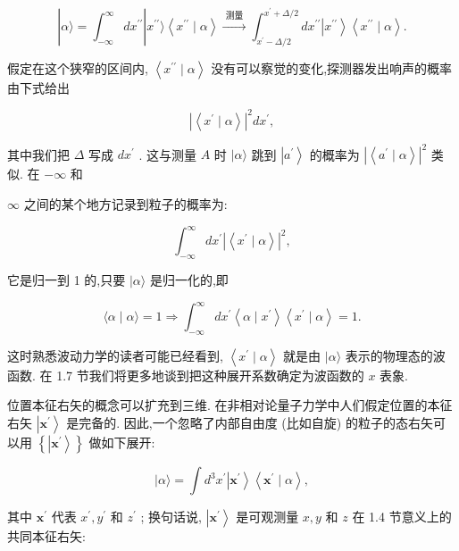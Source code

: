 \documentclass[lang=cn,newtx,10pt,scheme=chinese,thmcnt=section]{elegantbook}
\begin{document}
$$
\left| {\alpha \rangle = {\int }_{-\infty }^{\infty }d{x}^{\prime \prime }}\right| {x}^{\prime \prime }\rangle \left\langle {{x}^{\prime \prime } \mid \alpha }\right\rangle \overset{\text{ 测量 }}{ \rightarrow }{\int }_{{x}^{\prime } - \Delta /2}^{{x}^{\prime } + \Delta /2}d{x}^{\prime \prime }\left| {x}^{\prime \prime }\right\rangle \left\langle {{x}^{\prime \prime } \mid \alpha }\right\rangle . \tag{1. 6.5}
$$

假定在这个狭窄的区间内, $\left\langle {{x}^{\prime \prime } \mid \alpha }\right\rangle$ 没有可以察觉的变化,探测器发出响声的概率由下式给出

$$
{\left| \left\langle {x}^{\prime } \mid \alpha \right\rangle \right| }^{2}d{x}^{\prime }, \tag{1.6.6}
$$

其中我们把 $\Delta$ 写成 $d{x}^{\prime }$ . 这与测量 $A$ 时 $|\alpha \rangle$ 跳到 $\left| {a}^{\prime }\right\rangle$ 的概率为 ${\left| \left\langle {a}^{\prime } \mid \alpha \right\rangle \right| }^{2}$ 类似. 在 $- \infty$ 和

$\infty$ 之间的某个地方记录到粒子的概率为:

$$
{\int }_{-\infty }^{\infty }d{x}^{\prime }{\left| \left\langle {x}^{\prime } \mid \alpha \right\rangle \right| }^{2}, \tag{1.6.7}
$$

它是归一到 1 的,只要 $|\alpha \rangle$ 是归一化的,即

$$
\langle \alpha \mid \alpha \rangle = 1 \Rightarrow {\int }_{-\infty }^{\infty }d{x}^{\prime }\left\langle {\alpha \mid {x}^{\prime }}\right\rangle \left\langle {{x}^{\prime } \mid \alpha }\right\rangle = 1. \tag{1.6.8}
$$

这时熟悉波动力学的读者可能已经看到, $\left\langle {{x}^{\prime } \mid \alpha }\right\rangle$ 就是由 $|\alpha \rangle$ 表示的物理态的波函数. 在 1.7 节我们将更多地谈到把这种展开系数确定为波函数的 $x$ 表象.

位置本征右矢的概念可以扩充到三维. 在非相对论量子力学中人们假定位置的本征右矢 $\left| {\mathbf{x}}^{\prime }\right\rangle$ 是完备的. 因此,一个忽略了内部自由度 (比如自旋) 的粒子的态右矢可以用 $\left\{ \left| {\mathbf{x}}^{\prime }\right\rangle \right\}$ 做如下展开:

$$
|\alpha \rangle = \int {d}^{3}{x}^{\prime }\left| {\mathbf{x}}^{\prime }\right\rangle \left\langle {{\mathbf{x}}^{\prime } \mid \alpha }\right\rangle , \tag{1.6.9}
$$

其中 ${\mathbf{x}}^{\prime }$ 代表 ${x}^{\prime },{y}^{\prime }$ 和 ${z}^{\prime }$ ; 换句话说, $\left| {\mathbf{x}}^{\prime }\right\rangle$ 是可观测量 $x, y$ 和 $z$ 在 1.4 节意义上的共同本征右矢:
\end{document}
